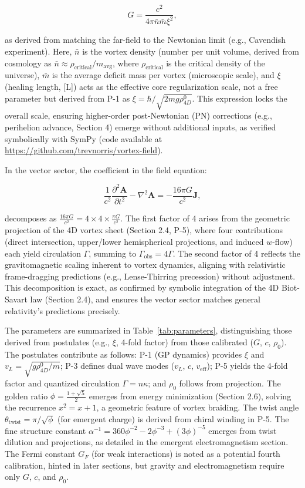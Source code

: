 \[
G = \frac{c^2}{4\pi \bar{n} \bar{m} \xi^2},
\]

as derived from matching the far-field to the Newtonian limit (e.g., Cavendish experiment). Here, $\bar{n}$ is the vortex density (number per unit volume, derived from cosmology as $\bar{n} \approx \rho_{\text{critical}} / m_{\text{avg}}$, where $\rho_{\text{critical}}$ is the critical density of the universe), $\bar{m}$ is the average deficit mass per vortex (microscopic scale), and $\xi$ (healing length, [L]) acts as the effective core regularization scale, not a free parameter but derived from P-1 as $\xi = \hbar / \sqrt{2 m g \rho_{4D}^0}$. This expression locks the overall scale, ensuring higher-order post-Newtonian (PN) corrections (e.g., perihelion advance, Section 4) emerge without additional inputs, as verified symbolically with SymPy (code available at \url{https://github.com/trevnorris/vortex-field}).

In the vector sector, the coefficient in the field equation:

\[
\frac{1}{c^2} \frac{\partial^2 \mathbf{A}}{\partial t^2} - \nabla^2 \mathbf{A} = -\frac{16\pi G}{c^2} \mathbf{J},
\]

decomposes as $\frac{16\pi G}{c^2} = 4 \times 4 \times \frac{\pi G}{c^2}$. The first factor of 4 arises from the geometric projection of the 4D vortex sheet (Section 2.4, P-5), where four contributions (direct intersection, upper/lower hemispherical projections, and induced $w$-flow) each yield circulation $\Gamma$, summing to $\Gamma_{\text{obs}} = 4\Gamma$. The second factor of 4 reflects the gravitomagnetic scaling inherent to vortex dynamics, aligning with relativistic frame-dragging predictions (e.g., Lense-Thirring precession) without adjustment. This decomposition is exact, as confirmed by symbolic integration of the 4D Biot-Savart law (Section 2.4), and ensures the vector sector matches general relativity's predictions precisely.

The parameters are summarized in Table~\ref{tab:parameters}, distinguishing those derived from postulates (e.g., $\xi$, 4-fold factor) from those calibrated ($G$, $c$, $\rho_0$). The postulates contribute as follows: P-1 (GP dynamics) provides $\xi$ and $v_L = \sqrt{g \rho_{4D}^0 / m}$; P-3 defines dual wave modes ($v_L$, $c$, $v_{\text{eff}}$); P-5 yields the 4-fold factor and quantized circulation $\Gamma = n \kappa$; and $\rho_0$ follows from projection. The golden ratio $\phi = \frac{1 + \sqrt{5}}{2}$ emerges from energy minimization (Section 2.6), solving the recurrence $x^2 = x + 1$, a geometric feature of vortex braiding. The twist angle $\theta_{\text{twist}} = \pi / \sqrt{\phi}$ (for emergent charge) is derived from chiral winding in P-5. The fine structure constant $\alpha^{-1} = 360 \phi^{-2} - 2 \phi^{-3} + (3 \phi)^{-5}$ emerges from twist dilution and projections, as detailed in the emergent electromagnetism section. The Fermi constant $G_F$ (for weak interactions) is noted as a potential fourth calibration, hinted in later sections, but gravity and electromagnetism require only $G$, $c$, and $\rho_0$.


